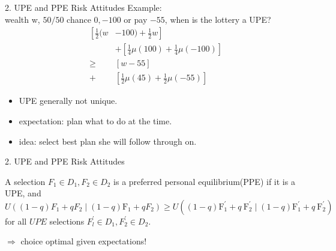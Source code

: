 \documentclass[11pt,aspectratio=169]{beamer}
\begin{document}
\begin{frame}{2. UPE and PPE Risk Attitudes}
Example:\\
wealth w, $50/50$ chance $0,-100$ or pay $-55$, when is the lottery a UPE?\\
$$
\begin{aligned}
{\left[\frac{1}{2}(w\right.} & \left.-100)+\frac{1}{2} w\right] \\
& +\left[\frac{1}{4} \mu(100)+\frac{1}{4} \mu(-100)\right] \\
\geq & {[w-55] } \\
+ & {\left[\frac{1}{2} \mu(45)+\frac{1}{2} \mu(-55)\right] }
\end{aligned}
$$
    \begin{itemize}
        \item UPE generally not unique.\medskip
        \item expectation: plan what to do at the time.\medskip
        \item idea: select best plan she will follow through on.\medskip
    \end{itemize}
\end{frame}

\begin{frame}{2. UPE and PPE Risk Attitudes}
    \begin{definition}[PPE]
        A selection $F_1 \in D_1, F_2 \in D_2$ is a preferred personal equilibrium(PPE) if it is a UPE, 
        and $U\left((1-q) F_1+q F_2 \mid(1-q) \mathrm{F}_1+qF_2\right) \geq U\left((1-q) \mathrm{F}_1^{\prime}+q \mathrm{~F}_2^{\prime} \mid(1-q) \mathrm{F}_1^{\prime}+q \mathrm{~F}_2^{\prime}\right)$ 
        for all $U P E$ selections $F_l^{\prime} \in D_1, F_2^{\prime} \in D_2$.\\
    \end{definition}
$\Rightarrow$ choice optimal given expectations!\\
\end{frame}
\end{document}
